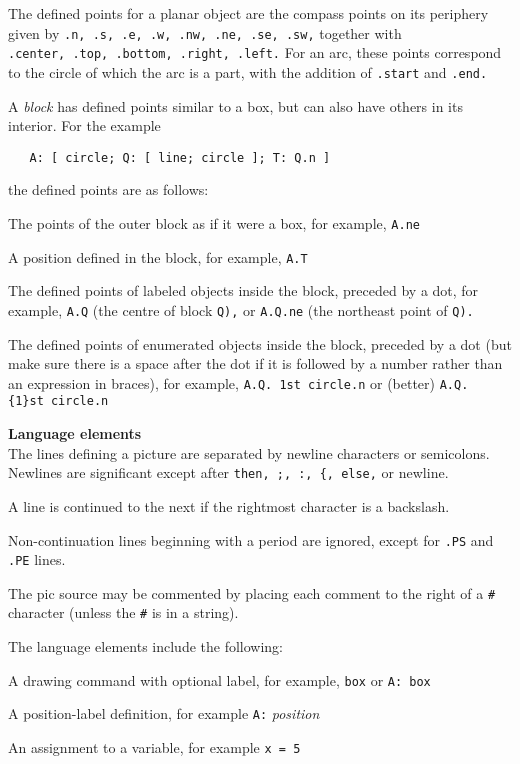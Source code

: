 The defined points for a planar object are the compass points
on its periphery given by
{\tt .n,\ .s,\ .e,\ .w,\ .nw,\ .ne,\ .se,\ .sw,}
together with
{\tt .center,\ .top,\ .bottom,\ .right,\ .left.}
For an arc, these points correspond to the circle of which the arc is a
part, with the addition of
{\tt .start}
and
{\tt .end.}

A
{\it block}
has defined points similar to a box, but can also have others in its
interior.
For the example

{\tt \ \ \ A:\ [\ circle;\ Q:\ [\ line;\ circle\ ];\ T:\ Q.n\ ]}

the defined points are as follows:

   The points of the outer block as if it were a box, for
   example,
{\tt A.ne}

   A position defined in the block, for example,
{\tt A.T}

   The defined points of labeled objects inside the block,
   preceded by a dot, for example,
{\tt A.Q}
(the centre of
   block
{\tt Q),}
or
{\tt A.Q.ne}
(the northeast point of
{\tt Q).}

   The defined points of enumerated objects inside the
   block, preceded by a dot (but make sure there is a space
   after the dot if it is followed by a number rather than
   an expression in braces), for example,
{\tt A.Q.\ 1st\ circle.n}
   or (better)
{\tt A.Q.\{1\}st\ circle.n}
\par\hskip-2pc{\bf Language elements}\\
The lines defining a picture are separated by newline characters
or semicolons.
Newlines are significant except after
{\tt then,\ ;,\ :,\ \{,\ else,}
or newline.

A line is continued to the next if the rightmost character is a backslash.

Non-continuation lines beginning with a period are ignored, except for
{\tt .PS}
and
{\tt .PE}
lines.

The
pic
source may be commented by placing each comment to the right of a
{\tt \#}
character (unless the
{\tt \#}
is in a string).

The language elements include the following:

   A drawing command with optional label, for example,
{\tt box}
or
{\tt A:\ box}

   A position-label definition, for example
{\tt A:}
{\it position}

   An assignment to a variable, for example
{\tt x = 5}

